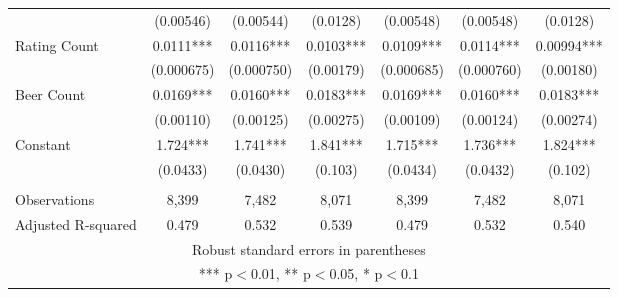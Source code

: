 \begin{tabular}{lcccccc}
    & (0.00546) & (0.00544) & (0.0128) & (0.00548) & (0.00548) & (0.0128) \\
   Rating Count & 0.0111*** & 0.0116*** & 0.0103*** & 0.0109*** & 0.0114*** & 0.00994*** \\
    & (0.000675) & (0.000750) & (0.00179) & (0.000685) & (0.000760) & (0.00180) \\
   Beer Count & 0.0169*** & 0.0160*** & 0.0183*** & 0.0169*** & 0.0160*** & 0.0183*** \\
    & (0.00110) & (0.00125) & (0.00275) & (0.00109) & (0.00124) & (0.00274) \\
   Constant & 1.724*** & 1.741*** & 1.841*** & 1.715*** & 1.736*** & 1.824*** \\
    & (0.0433) & (0.0430) & (0.103) & (0.0434) & (0.0432) & (0.102) \\
    &  &  &  &  &  &  \\
   Observations & 8,399 & 7,482 & 8,071 & 8,399 & 7,482 & 8,071 \\
    Adjusted R-squared & 0.479 & 0.532 & 0.539 & 0.479 & 0.532 & 0.540 \\ \hline
   \multicolumn{7}{c}{ Robust standard errors in parentheses} \\
   \multicolumn{7}{c}{ *** p$<$0.01, ** p$<$0.05, * p$<$0.1} \\
   \end{tabular}